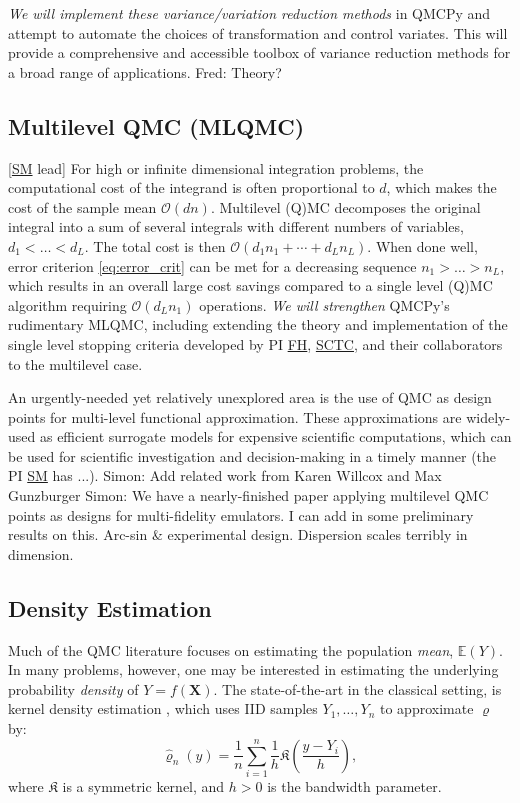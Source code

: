 \documentclass[11pt]{NSFamsart}
\newcommand{\FH}{\hyperlink{FHlink}{FH}\xspace}
\newcommand{\SM}{\hyperlink{SMlink}{SM}\xspace}
\newcommand{\SCTC}{\hyperlink{SCTClink}{SCTC}\xspace}
\newcommand{\bX}{{\boldsymbol{X}}}
\newcommand{\fK}{{\mathfrak{K}}}
\newcommand{\Order}{\mathcal{O}}
\newcommand{\FJHNote}[1]{{\color{blue}Fred: #1}}
\newcommand{\SMNote}[1]{{\color{blue}Simon: #1}}
\begin{document}
\textit{We will implement these variance/variation reduction methods} in QMCPy and attempt to automate the choices of transformation and control variates. This will provide  a comprehensive and accessible toolbox of variance reduction methods for a broad range of applications. \FJHNote{Theory?}

\subsection{Multilevel QMC (MLQMC)}[\SM lead]
For high or infinite dimensional integration problems, the computational cost of the integrand is often proportional to $d$, which makes the cost of the sample mean $\Order(dn)$.  Multilevel (Q)MC \cite{Gil15a} decomposes the original integral into a sum of several integrals with different numbers of variables, $d_1 < \dots < d_L$.  The total cost is then $\Order(d_1 n_1 + \cdots + d_L n_L)$. When done well, error criterion \eqref{eq:error_crit} can be met for a decreasing sequence $n_1 > \dots > n_L$, which results in an overall large cost savings compared to a single level (Q)MC algorithm requiring $\Order(d_Ln_1)$ operations. \emph{We will strengthen} QMCPy's rudimentary MLQMC, including extending the theory and implementation of the single level stopping criteria developed by PI \FH, \SCTC, and their collaborators \cite{HicEtal14a,HicJim16a,JimHic16a,HicEtal17a,RatHic19a} to the multilevel case.

An urgently-needed yet relatively unexplored area is the use of QMC as design points for multi-level functional approximation. These approximations are widely-used as efficient surrogate models for expensive scientific computations, which can be used for scientific investigation and decision-making in a timely manner (the PI \SM has ...). \SMNote{Add related work from Karen Willcox and Max Gunzburger} \SMNote{We have a nearly-finished paper applying multilevel QMC points as designs for multi-fidelity emulators. I can add in some preliminary results on this. Arc-sin \& experimental design. Dispersion scales terribly in dimension.}

\iffalse
\subsection{Density Estimation}

Much of the QMC literature focuses on estimating the population \textit{mean}, $\mathbb{E}(Y)$. In many problems, however, one may be interested in estimating the underlying probability \textit{density} of $Y = f(\bX)$. The state-of-the-art in the classical setting, is kernel density estimation \cite{silverman1986density}, which uses IID samples $Y_1, \dots, Y_n$ to approximate $\varrho$ by:
\begin{equation}\label{eq:kerndens}
\hat{\varrho}_n(y) = \frac{1}{n} \sum_{i=1}^n \frac{1}{h} \fK \left( \frac{y - Y_i}{h} \right),
\end{equation}
where $\fK$ is a symmetric kernel, and $h>0$ is the bandwidth parameter.
\end{document}
